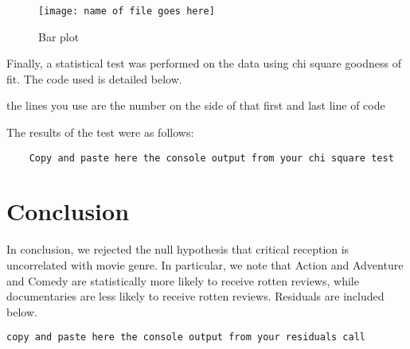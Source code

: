 \documentclass[12pt,a4paper]{article}
\begin{document}
\begin{figure}[h!]\centering
	\caption{\footnotesize Bar plot}
	\texttt{[image: name of file goes here]}
\end{figure} 

Finally, a statistical test was performed on the data using chi square goodness of fit. The code used is detailed below.



the lines you use are the number on the side of that first and last line of code

The results of the test were as follows:

\begin{verbatim}
	Copy and paste here the console output from your chi square test
\end{verbatim}

\section*{Conclusion}

In conclusion, we rejected the null hypothesis that critical reception is uncorrelated with movie genre. In particular, we note that Action and Adventure and Comedy are statistically more likely to receive rotten reviews, while documentaries are less likely to receive rotten reviews. Residuals are included below.

\begin{verbatim}
copy and paste here the console output from your residuals call
\end{verbatim}
\end{document}
